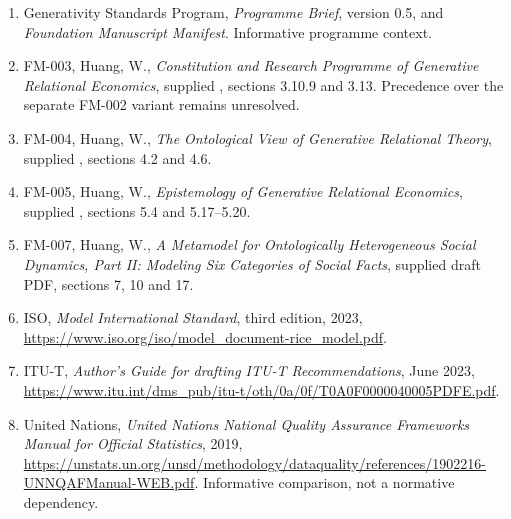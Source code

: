 \documentclass[11pt,a4paper]{article}
\begin{document}
\GSPbibliography
\begin{enumerate}
\item Generativity Standards Program, \emph{Programme Brief}, version 0.5, and \emph{Foundation Manuscript Manifest}. Informative programme context.
\item FM-003, Huang, W., \emph{Constitution and Research Programme of Generative Relational Economics}, supplied , sections 3.10.9 and 3.13. Precedence over the separate FM-002 variant remains unresolved.
\item FM-004, Huang, W., \emph{The Ontological View of Generative Relational Theory}, supplied , sections 4.2 and 4.6.
\item FM-005, Huang, W., \emph{Epistemology of Generative Relational Economics}, supplied , sections 5.4 and 5.17--5.20.
\item FM-007, Huang, W., \emph{A Metamodel for Ontologically Heterogeneous Social Dynamics, Part II: Modeling Six Categories of Social Facts}, supplied draft PDF, sections 7, 10 and 17.
\item ISO, \emph{Model International Standard}, third edition, 2023, \url{https://www.iso.org/iso/model_document-rice_model.pdf}.
\item ITU-T, \emph{Author's Guide for drafting ITU-T Recommendations}, June 2023, \url{https://www.itu.int/dms_pub/itu-t/oth/0a/0f/T0A0F0000040005PDFE.pdf}.
\item United Nations, \emph{United Nations National Quality Assurance Frameworks Manual for Official Statistics}, 2019, \url{https://unstats.un.org/unsd/methodology/dataquality/references/1902216-UNNQAFManual-WEB.pdf}. Informative comparison, not a normative dependency.
\end{enumerate}
\end{document}
